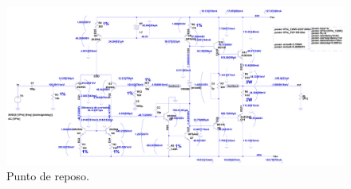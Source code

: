 \begin{figure}[H] %
\begin{center}
\includegraphics[width=0.93 \textheight, angle=90]{./img/qpoint/amplifier_qpoint.png}
\caption{\label{fig:fig_q_point}\footnotesize{Punto de reposo.}}
\end{center}
\end{figure}

\clearpage



 
